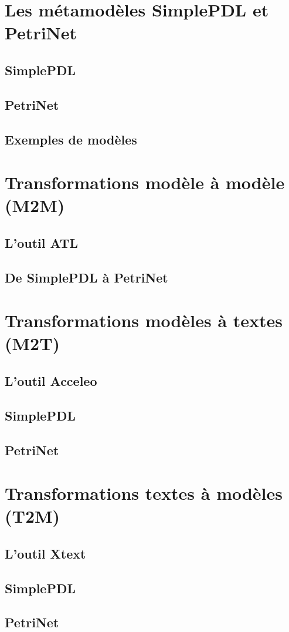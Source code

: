 \documentclass{rapport_gls}
\begin{document}


\newpage

\tableofcontents

\newpage

\chapter{Les métamodèles SimplePDL et PetriNet}

\section{SimplePDL}

\newpage
\section{PetriNet}

\newpage
\section{Exemples de modèles}


\chapter{Transformations modèle à modèle (M2M)}

\section{L'outil ATL}

\section{De SimplePDL à PetriNet}


\chapter{Transformations modèles à textes (M2T)}
%
\section{L'outil Acceleo}
%
\section{SimplePDL}
%
\section{PetriNet}


\chapter{Transformations textes à modèles (T2M)}
%
\section{L'outil Xtext}
%
\section{SimplePDL}
%
\section{PetriNet}
%
\end{document}
